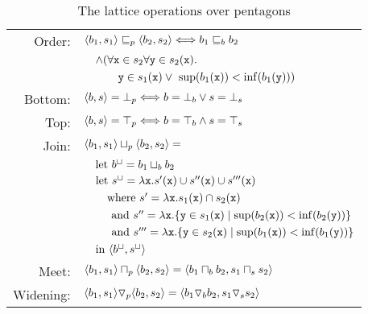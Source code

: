 \documentclass{sig-alternate}
\begin{document}
\begin{table}
\small
\begin{tabular}{rl}
Order:& $\langle b_1, s_1 \rangle \sqsubseteq_p \langle b_2, s_2 \rangle   \Longleftrightarrow  b_1 \sqsubseteq_b b_2 $ \\
& $ \quad \wedge (\forall \mathtt{x} \in s_2 \forall\mathtt{y} \in s_2(\mathtt{x}).$ \\
& $\quad \quad \quad  \mathtt{y} \in s_1(\mathtt{x}) \vee\ \mathrm{sup}(b_1(\mathtt{x})) < \mathrm{inf}(b_1(\mathtt{y}))) $ \\
Bottom:& $\langle b, s \rangle  = {\bot}_p \Longleftrightarrow b = {\bot}_b \vee  s = {\bot}_s $ \\
Top:& $ \langle b, s \rangle = {\top}_p \Longleftrightarrow b = {\top}_b \wedge s = {\top}_s $\\
Join:& $\langle b_1, s_1 \rangle  \sqcup_p  \langle b_2, s_2 \rangle  = $ \\
& $\quad \mathrm{let}\ b^\sqcup = b_1 \sqcup_b b_2$ \\
& $\quad \mathrm{let}\ s^\sqcup = \lambda \mathtt{x}.  s'(\mathtt{x}) \cup s''(\mathtt{x}) \cup s'''(\mathtt{x})$ \\
& $\quad \quad \mathrm{where}\ s' = \lambda \mathtt{x}. s_1(\mathtt{x}) \cap s_2(\mathtt{x})$ \\
& $\quad \phantom{\lambda \code{x}.} \mathrm{and}\ s'' = \lambda \code{x}. \{\code{y} \in s_1(\code{x}) \mid \mathrm{sup}(b_2(\code{x})) < \mathrm{inf}(b_2(\code{y})) \}$ \\
& $\quad  \phantom{\lambda \code{x}.} \mathrm{and}\ s''' =  \lambda \code{x}. \{\code{y} \in s_2(\code{x}) \mid \mathrm{sup}(b_1(\code{x})) < \mathrm{inf}(b_1(\code{y})) \}$ \\
& $\quad \mathrm{in}\ \langle  b^\sqcup, s^\sqcup \rangle$ \\
Meet:& $ \langle b_1, s_1 \rangle  \sqcap_p  \langle b_2, s_2 \rangle  = \langle b_1 \sqcap_b b_2, s_1 \sqcap_s s_2 \rangle $  \\
Widening:&  $ \langle b_1, s_1 \rangle  \triangledown_p \langle b_2, s_2 \rangle  = \langle b_1 \triangledown_b b_2, s_1 \triangledown_s s_2 \rangle$
\end{tabular}
\caption{The lattice operations over pentagons}
\label{tab:pentagons}
\end{table} 
\end{document}

